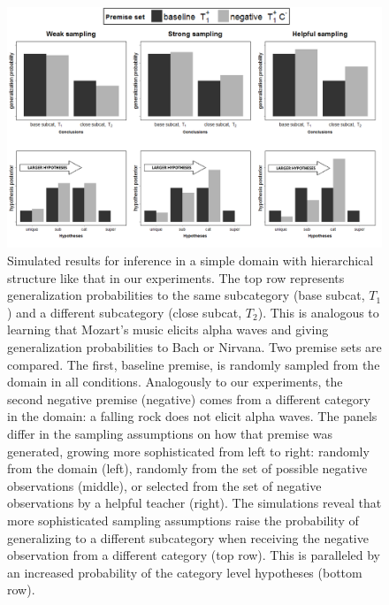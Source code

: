 \documentclass[authoryear,11pt]{elsarticle}
\begin{document}
\begin{figure}[t!]
\includegraphics[trim = 2mm 0mm 7mm 0mm, clip,scale=.36]{fig/modelsimulations.png}
\vspace{-3mm}
\caption{Simulated results for inference in a simple domain with hierarchical structure like that in our experiments. The top row represents generalization probabilities to the same subcategory ({\sc base subcat, $T_1$}) and a different subcategory ({\sc close subcat, $T_2$}). This is analogous to learning that Mozart's music elicits alpha waves and giving generalization probabilities to Bach or Nirvana. Two premise sets are compared. The first, {\sc baseline} premise, is randomly sampled from the domain in all conditions. Analogously to our experiments, the second negative premise ({\sc negative}) comes from a different category in the domain: a falling rock does not elicit alpha waves. The panels differ in the sampling assumptions on how that premise was generated, growing more sophisticated from left to right: randomly from the domain (left), randomly from the set of possible negative observations (middle), or selected from the set of negative observations by a helpful teacher (right). The simulations reveal that more sophisticated sampling assumptions raise the probability of generalizing to a different subcategory when receiving the negative observation from a different category (top row). This is paralleled by an increased probability of the {\sc category} level hypotheses (bottom row).}
\label{fig:toys}
\end{figure}
\end{document}
